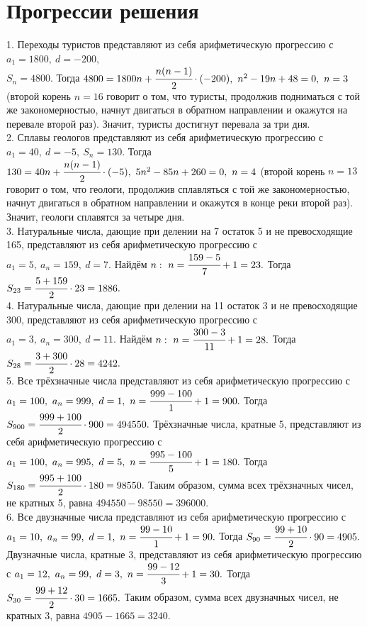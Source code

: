 \documentclass[12pt]{article}
\begin{document}
\section{Прогрессии решения}
1. Переходы туристов представляют из себя арифметическую прогрессию с $a_1=1800,\ d=-200,$\\$S_n=4800.$ Тогда $4800=1800n+\cfrac{n(n-1)}{2}\cdot(-200),\
n^2-19n+48=0,\ n=3$ (второй корень $n=16$ говорит о том, что туристы, продолжив подниматься с той же закономерностью, начнут двигаться в обратном направлении и окажутся на перевале второй раз). Значит, туристы достигнут перевала за три дня.\\
2. Сплавы геологов представляют из себя арифметическую прогрессию с $a_1=40,\ d=-5,\ S_n=130.$ Тогда $130=40n+\cfrac{n(n-1)}{2}\cdot(-5),\
5n^2-85n+260=0,\ n=4$ (второй корень $n=13$ говорит о том, что геологи, продолжив сплавляться с той же закономерностью, начнут двигаться в обратном направлении и окажутся в конце реки второй раз). Значит, геологи сплавятся за четыре дня.\\
3. Натуральные числа, дающие при делении на 7 остаток 5 и не превосходящие 165, представляют из себя арифметическую прогрессию с $a_1=5,\ a_n=159,\ d=7.$ Найдём $n:\ n=\cfrac{159-5}{7}+1=23.$ Тогда $S_{23}=\cfrac{5+159}{2}\cdot23=1886.$\\
4. Натуральные числа, дающие при делении на 11 остаток 3 и не превосходящие 300, представляют из себя арифметическую прогрессию с $a_1=3,\ a_n=300,\ d=11.$ Найдём $n:\ n=\cfrac{300-3}{11}+1=28.$ Тогда $S_{28}=\cfrac{3+300}{2}\cdot28=4242.$\\
5. Все трёхзначные числа представляют из себя арифметическую прогрессию с $a_1=100,\ a_n=999,\ d=1,\ n=\cfrac{999-100}{1}+1=900.$ Тогда $S_{900}=\cfrac{999+100}{2}\cdot900=494550.$ Трёхзначные числа, кратные 5, представляют из себя арифметическую прогрессию с $a_1=100,\ a_n=995,\ d=5,\ n=\cfrac{995-100}{5}+1=180.$ Тогда $S_{180}=\cfrac{995+100}{2}\cdot180=98550.$ Таким образом, сумма всех трёхзначных чисел, не кратных 5, равна $494550-98550=396000.$\\
6. Все двузначные числа представляют из себя арифметическую прогрессию с $a_1=10,\ a_n=99,\ d=1,\ n=\cfrac{99-10}{1}+1=90.$ Тогда $S_{90}=\cfrac{99+10}{2}\cdot90=4905.$ Двузначные числа, кратные 3, представляют из себя арифметическую прогрессию с $a_1=12,\ a_n=99,\ d=3,\ n=\cfrac{99-12}{3}+1=30.$ Тогда $S_{30}=\cfrac{99+12}{2}\cdot30=1665.$ Таким образом, сумма всех двузначных чисел, не кратных 3, равна $4905-1665=3240.$\\
\end{document}
